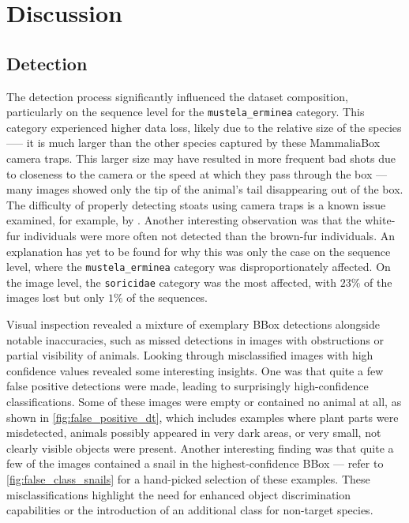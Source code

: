 


\section{Discussion}
\label{discussion}

\subsection{Detection}
The detection process significantly influenced the dataset composition, particularly on the sequence level for the \texttt{mustela\_erminea} category.
This category experienced higher data loss, likely due to the relative size of the species —-- it is much larger than the other species captured by these MammaliaBox camera traps.
This larger size may have resulted in more frequent bad shots due to closeness to the camera or the speed at which they pass through the box --- many images showed only the tip of the animal's tail disappearing out of the box.
The difficulty of properly detecting stoats using camera traps is a known issue examined, for example, by \textcite{crooseAssessingDetectabilityIrish2022}.
Another interesting observation was that the white-fur individuals were more often not detected than the brown-fur individuals.
An explanation has yet to be found for why this was only the case on the sequence level, where the \texttt{mustela\_erminea} category was disproportionately affected.
On the image level, the \texttt{soricidae} category was the most affected, with \(23\%\) of the images lost but only \(1\%\) of the sequences.

Visual inspection revealed a mixture of exemplary BBox detections alongside notable inaccuracies, such as missed detections in images with obstructions or partial visibility of animals.
Looking through misclassified images with high confidence values revealed some interesting insights.
One was that quite a few false positive detections were made, leading to surprisingly high-confidence classifications.
Some of these images were empty or contained no animal at all, as shown in \autoref{fig:false_positive_dt}, which includes examples where plant parts were misdetected, animals possibly appeared in very dark areas, or very small, not clearly visible objects were present.
Another interesting finding was that quite a few of the images contained a snail in the highest-confidence BBox --- refer to \autoref{fig:false_class_snails} for a hand-picked selection of these examples.
These misclassifications highlight the need for enhanced object discrimination capabilities or the introduction of an additional class for non-target species.

